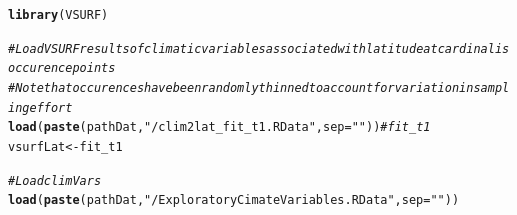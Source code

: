 \documentclass[11pt, oneside]{article}\usepackage[]{graphicx}\usepackage[]{color}
\makeatletter
\newcommand{\hlstr}[1]{\textcolor[rgb]{0.192,0.494,0.8}{#1}}%
\newcommand{\hlcom}[1]{\textcolor[rgb]{0.678,0.584,0.686}{\textit{#1}}}%
\newcommand{\hlstd}[1]{\textcolor[rgb]{0.345,0.345,0.345}{#1}}%
\newcommand{\hlkwb}[1]{\textcolor[rgb]{0.69,0.353,0.396}{#1}}%
\newcommand{\hlkwc}[1]{\textcolor[rgb]{0.333,0.667,0.333}{#1}}%
\newcommand{\hlkwd}[1]{\textcolor[rgb]{0.737,0.353,0.396}{\textbf{#1}}}%
\newenvironment{kframe}{%
 \def\at@end@of@kframe{}%
 \ifinner\ifhmode%
  \def\at@end@of@kframe{\end{minipage}}%
  \begin{minipage}{\columnwidth}%
 \fi\fi%
 \def\FrameCommand##1{\hskip\@totalleftmargin \hskip-\fboxsep
 \colorbox{shadecolor}{##1}\hskip-\fboxsep
     \hskip-\linewidth \hskip-\@totalleftmargin \hskip\columnwidth}%
 \MakeFramed {\advance\hsize-\width
   \@totalleftmargin\z@ \linewidth\hsize
   \@setminipage}}%
 {\par\unskip\endMakeFramed%
 \at@end@of@kframe}
\newenvironment{knitrout}{}{} %
\makeatother
\begin{document}
\begin{knitrout}
\color{fgcolor}\begin{kframe}
\begin{alltt}
\hlkwd{library}\hlstd{(VSURF)}
\end{alltt}


{\ttfamily\noindent\itshape\color{messagecolor}{\#\# Loading required package: randomForest\\\#\# randomForest 4.6-10\\\#\# Type rfNews() to see new features/changes/bug fixes.\\\#\# Loading required package: rpart\\\#\# Loading required package: doParallel\\\#\# Loading required package: foreach\\\#\# Loading required package: iterators\\\#\# Loading required package: parallel}}\begin{alltt}
  \hlcom{# Load VSURF results of climatic variables associated with latitude at cardinalis occurence points}
  \hlcom{# Note that occurences have been randomly thinned to account for variation in sampling effort}
  \hlkwd{load}\hlstd{(}\hlkwd{paste}\hlstd{(pathDat,} \hlstr{"/clim2lat_fit_t1.RData"}\hlstd{,} \hlkwc{sep} \hlstd{=} \hlstr{""}\hlstd{))} \hlcom{# fit_t1}
  \hlstd{vsurfLat} \hlkwb{<-} \hlstd{fit_t1}

        \hlcom{# Load climVars}
        \hlkwd{load}\hlstd{(}\hlkwd{paste}\hlstd{(pathDat,} \hlstr{"/ExploratoryCimateVariables.RData"}\hlstd{,} \hlkwc{sep} \hlstd{=} \hlstr{""}\hlstd{))}


\end{alltt}
\end{kframe}
\end{knitrout}
\end{document}
